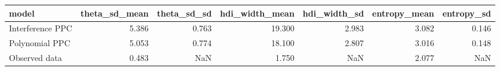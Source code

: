 \begin{tabular}{lrrrrrr}
\toprule
model & theta_sd_mean & theta_sd_sd & hdi_width_mean & hdi_width_sd & entropy_mean & entropy_sd \\
\midrule
Interference PPC & 5.386 & 0.763 & 19.300 & 2.983 & 3.082 & 0.146 \\
Polynomial PPC & 5.053 & 0.774 & 18.100 & 2.807 & 3.016 & 0.148 \\
Observed data & 0.483 & NaN & 1.750 & NaN & 2.077 & NaN \\
\bottomrule
\end{tabular}
